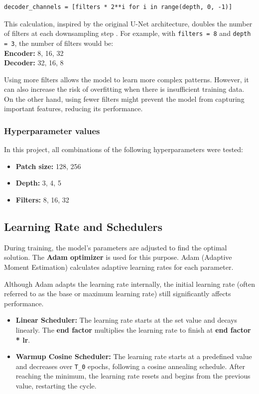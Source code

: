 \begin{verbatim}
decoder_channels = [filters * 2**i for i in range(depth, 0, -1)]
\end{verbatim}

This calculation, inspired by the original U-Net architecture, doubles the number of filters at each downsampling step \cite{2018arXiv180906839B}. For example, with \texttt{filters = 8} and \texttt{depth = 3}, the number of filters would be:  
\\\textbf{Encoder:} 8, 16, 32 \\
\textbf{Decoder:} 32, 16, 8

Using more filters allows the model to learn more complex patterns. However, it can also increase the risk of overfitting when there is insufficient training data. On the other hand, using fewer filters might prevent the model from capturing important features, reducing its performance.
\subsubsection{Hyperparameter values}\label{sec:1.2.8}

In this project, all combinations of the following hyperparameters were tested:

\begin{itemize}
    \item \textbf{Patch size:} 128, 256
    \item \textbf{Depth:} 3, 4, 5
    \item \textbf{Filters:} 8, 16, 32
\end{itemize}

\subsection{Learning Rate and Schedulers}\label{sec:1.2.9}

During training, the model's parameters are adjusted to find the optimal solution. The \textbf{Adam optimizer} \cite{kingma2017adammethodstochasticoptimization} is used for this purpose. Adam (Adaptive Moment Estimation) calculates adaptive learning rates for each parameter.

Although Adam adapts the learning rate internally, the initial learning rate (often referred to as the base or maximum learning rate) still significantly affects performance.
\begin{itemize}
    \item \textbf{Linear Scheduler:} The learning rate starts at the set value and decays linearly. The \textbf{end factor} multiplies the learning rate to finish at \textbf{end factor * lr}.
    \item \textbf{Warmup Cosine Scheduler:} The learning rate starts at a predefined value and decreases over \texttt{T\_0} epochs, following a cosine annealing schedule. After reaching the minimum, the learning rate resets and begins from the previous value, restarting the cycle.
\end{itemize}

